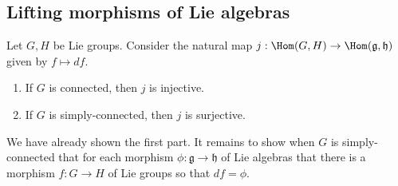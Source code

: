 \documentclass[reqno]{amsart} 
\begin{document}

\subsection{Lifting morphisms of Lie algebras}
\label{sec:org6f964c7}
\begin{theorem}
  Let $G,H$ be Lie groups.  Consider the natural map $j : \Hom(G,H) \rightarrow \Hom(\mathfrak{g},\mathfrak{h})$ given by $f \mapsto d f$.
  \begin{enumerate}
  \item If $G$ is connected, then $j$ is injective.
  \item If $G$ is simply-connected, then $j$ is surjective.
  \end{enumerate}
\end{theorem}
We have already shown the first part.  It remains to show when $G$ is simply-connected that for each morphism $\phi : \mathfrak{g} \rightarrow \mathfrak{h}$ of Lie algebras that there is a morphism $f : G \rightarrow H$ of Lie groups so that $d f = \phi$.
\end{document}
